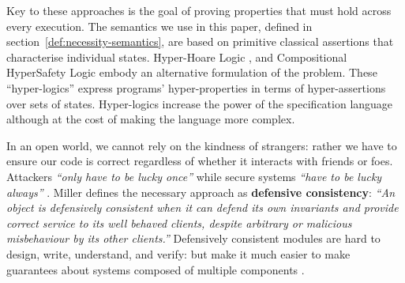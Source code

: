 Key to these approaches is the goal of proving properties that must
hold across every execution. The semantics we use in this paper,
defined in section~\ref{def:necessity-semantics}, are based on
primitive classical assertions that characterise individual states.
%
Hyper-Hoare Logic \cite{hyper-hoare-pldi2024}, and Compositional
HyperSafety Logic \cite{compositional-hypersafety-oopsla2022} embody
an alternative formulation of the problem. These ``hyper-logics''
express 
programs' hyper-properties in terms of hyper-assertions
over sets of states.
Hyper-logics increase the power of the specification language although
at the cost of making the language more complex.

















In an open world, we cannot rely on the kindness of strangers: rather
we have to ensure our code is correct regardless of whether it
interacts with friends or foes.
Attackers 
\textit{``only have to be lucky once''} while secure systems 
\textit{``have to be lucky always''} \cite{IRAThatcher}.
Miller \cite{miller-esop2013,MillerPhD} defines the necessary approach
as \textbf{defensive consistency}: \textit{``An object is defensively
  consistent when it can defend its own invariants and provide correct
  service to its well behaved clients, despite arbitrary or malicious
  misbehaviour by its other clients.''}  Defensively consistent
modules are hard to design,  write,  understand, and
verify: but
make it much
easier to make guarantees about systems composed of multiple components
\cite{Murray10dphil}.







